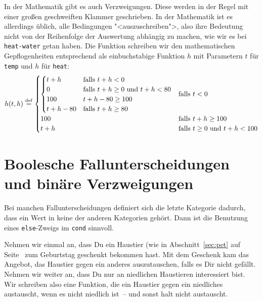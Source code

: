 In der Mathematik gibt es auch Verzweigungen.  Diese werden in der
Regel mit einer großen geschweiften Klammer geschrieben.  In der
Mathematik ist es allerdings üblich, alle Bedingungen
"<auszuschreiben">, also ihre Bedeutung nicht von der Reihenfolge der
Auswertung abhängig zu machen, wie wir es bei \texttt{heat-water}
getan haben.  Die Funktion schreiben wir den mathematischen
Gepflogenheiten entsprechend als einbuchstabige Funktion $h$ mit
Parametern $t$ für \texttt{temp} und $h$ für \texttt{heat}:
%
\begin{displaymath}
  h(t, h) \stackrel{\rm def}{=}
  \begin{cases}
    \begin{cases}
      t + h & \text{falls } t + h < 0\\
      0 & \text{falls } t + h \geq 0 \text{ und } t + h < 80 \\
      100 & t + h - 80 \geq 100\\
      t + h - 80 & \text{falls }  t +h \geq
      80
    \end{cases}
    & \text{falls } t < 0
    \\
    100 & \text{falls } t + h \geq 100
    \\
    t + h & \text{falls } t \geq 0 \text{ und } t + h < 100
  \end{cases}
\end{displaymath}

\section{Boolesche Fallunterscheidungen und binäre Verzweigungen}
\label{sec:binaere-verzweigungen}

Bei manchen Fallunterscheidungen definiert sich die letzte Kategorie
dadurch, dass ein Wert in keine der anderen Kategorien gehört.  Dann
ist die Benutzung eines \texttt{else}-Zweigs im \texttt{cond}
sinnvoll.

Nehmen wir einmal an, dass Du ein Haustier (wie in
Abschnitt~\ref{sec:pet} auf Seite~\pageref{sec:pet} zum Geburtstag
geschenkt bekommen hast. Mit dem Geschenk kam das Angebot, das
Haustier gegen ein anderes auszutauschen, falls es Dir nicht gefällt.
Nehmen wir weiter an, dass Du nur an niedlichen Haustieren
interessiert bist.  Wir schreiben also eine Funktion, die ein Haustier
gegen ein niedliches austauscht, wenn es nicht niedlich ist~-- und
sonst halt nicht austauscht.


